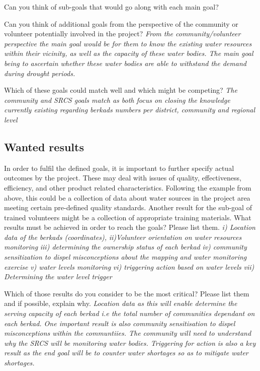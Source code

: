 Can you think of sub-goals that would go along with each main goal?

Can you think of additional goals from the perspective of the community or volunteer potentially involved in the project?\newline
\textit{From the community/volunteer perspective the main goal would be for them to know the existing water resources within their vicinity, as well as the capacity of these water bodies. The main goal being to ascertain whether these water bodies are able to withstand the demand during drought periods.}

Which of these goals could match well and which might be competing?\newline
\textit{The community and SRCS goals match as both focus on closing the knowledge currently existing regarding berkads numbers per district, community and regional level}

\subsection*{Wanted results}
In order to fulfil the defined goals, it is important to further specify actual outcomes by the project. These may deal with issues of quality, effectiveness, efficiency, and other product related characteristics. Following the example from above, this could be a collection of data about water sources in the project area meeting certain pre-defined quality standards. Another result for the sub-goal of trained volunteers might be a collection of appropriate training materials.
What results must be achieved in order to reach the goals? Please list them.\newline
\textit{i) Location data of the berkads (coordinates),}\newline
\textit{ii)Volunteer orientation on water resources monitoring}\newline
\textit{iii) determining the ownership status of each berkad}\newline
\textit{iv) community sensitization to dispel misconceptions about the mapping and water monitoring exercise}\newline
\textit{v) water levels monitoring}\newline
\textit{vi) triggering action based on water levels}\newline
\textit{vii) Determining the water level trigger}

Which of those results do you consider to be the most critical? Please list them and if possible, explain why.\newline
\textit{Location data as this will enable determine the serving capacity of each berkad i.e the total number of communities dependant on each berkad. One important result is also community sensitisation to dispel misconceptions within the communtiies. The community will need to understand why the SRCS will be monitoring water bodies. Triggering for action is also a key result as the end goal will be to counter water shortages so as to mitigate water shortages.}

